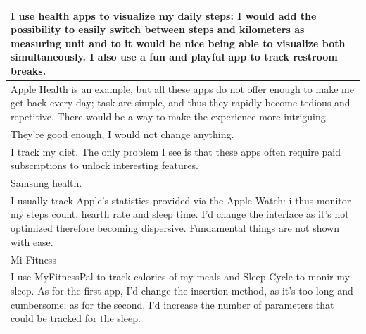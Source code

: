 \documentclass{article}
\begin{document}
\begin{table}[H]
\begin{tabularx}{0.9\textwidth}{X}
        \hline
        I use health apps to visualize my daily steps: I would add the possibility to easily switch between steps and kilometers as measuring unit and to it would be nice being able to visualize both simultaneously. I also use a fun and playful app to track restroom breaks. \\
        \hline
        Apple Health is an example, but all these apps do not offer enough to make me get back every day; task are simple, and thus they rapidly become tedious and repetitive. There would be a way to make the experience more intriguing. \\
        \hline
        They're good enough, I would not change anything. \\
        \hline
        I track my diet. The only problem I see is that these apps often require paid subscriptions to unlock interesting features. \\
        \hline
        Samsung health. \\
        \hline
        I usually track Apple's statistics provided via the Apple Watch: i thus monitor my steps count, hearth rate and sleep time. I'd change the interface as it's not optimized therefore becoming dispersive. Fundamental things are not shown with ease. \\
        \hline
        Mi Fitness \\
        \hline
        I use MyFitnessPal to track calories of my meals and Sleep Cycle to monir my sleep. As for the first app, I'd change the insertion method, as it's too long and cumbersome; as for the second, I'd increase the number of parameters that could be tracked for the sleep. \\
        \hline
    \end{tabularx}
\end{table}
\end{document}
